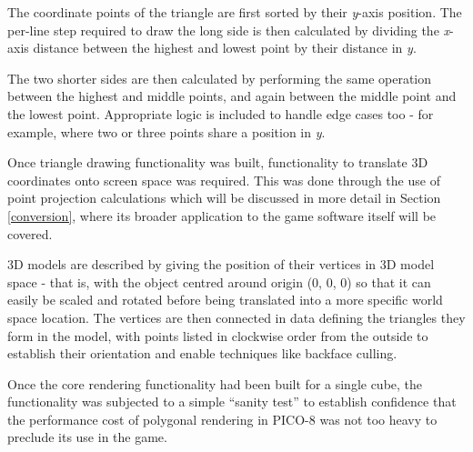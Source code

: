 \documentclass[11pt]{article}
\begin{document}

The coordinate points of the triangle are first sorted by their \textit{y}-axis position. The
per-line step required to draw the long side is then calculated by dividing the \textit{x}-axis
distance between the highest and lowest point by their distance in \textit{y}.

The two shorter sides are then calculated by performing the same operation between the highest
and middle points, and again between the middle point and the lowest point. Appropriate logic is
included to handle edge cases too - for example, where two or three points share a position in
\textit{y}.


Once triangle drawing functionality was built, functionality to translate 3D coordinates onto
screen space was required. This was done through the use of point projection calculations which
will be discussed in more detail in Section \ref{conversion},
where its broader application to the game software itself will be covered.


3D models are described by giving the position of their vertices in 3D model space - that is,
with the object centred around origin (0, 0, 0) so that it can easily be scaled and rotated
before being translated into a more specific world space location. The vertices are then connected
in data defining the triangles they form in the model, with points listed in clockwise order from
the outside to establish their orientation and enable techniques like backface culling.





Once the core rendering functionality had been built for a single cube, the functionality
was subjected to a simple ``sanity test'' to establish confidence that the performance
cost of polygonal rendering in PICO-8 was not too heavy to preclude its use in the
game.
\end{document}
